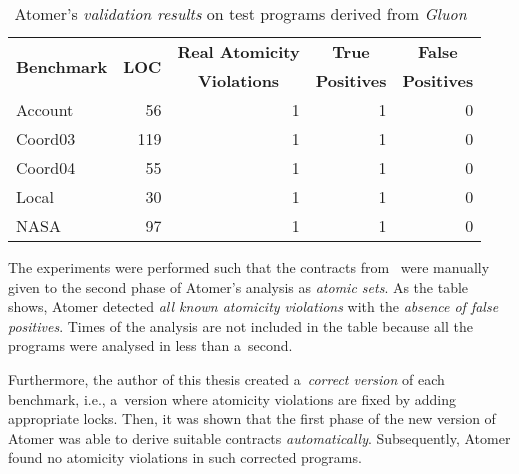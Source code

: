 \begin{table}[hbt]
    \centering

    \begin{tabular}{|l|r|r|r|r|}
        \hline

        \multirow{2}{*}{\textbf{Benchmark}} & \multirow{2}{*}{\textbf{LOC}} & \multicolumn{1}{c|}{\textbf{Real Atomicity}} & \multicolumn{1}{c|}{\textbf{True}} & \multicolumn{1}{c|}{\textbf{False}} \\
        
        & & \multicolumn{1}{c|}{\textbf{Violations}} & \multicolumn{1}{c|}{\textbf{Positives}} & \multicolumn{1}{c|}{\textbf{Positives}} \\ \hline \hline

        Account~\cite{atomicityOOP} & 56 & 1 & 1 & 0 \\ \hline
        
        Coord03~\cite{hlDataRaces} & 119 & 1 & 1 & 0 \\ \hline
        
        Coord04~\cite{blockLocalAtom} & 55 & 1 & 1 & 0 \\ \hline
        
        Local~\cite{hlDataRaces} & 30 & 1 & 1 & 0 \\ \hline
        
        NASA~\cite{hlDataRaces} & 97 & 1 & 1 & 0 \\ \hline
    \end{tabular}

    \caption{Atomer's \emph{validation results} on test programs derived from \emph{Gluon}~\cite{contracts2017, contracts2015}}
    \label{tab:expGluon}
\end{table}

The experiments were performed such that the contracts from~\cite{contracts2017} were manually given to the second phase of Atomer's analysis as \emph{atomic sets}. As the table shows, Atomer detected \emph{all known atomicity violations} with the \emph{absence of false positives}. Times of the analysis are not included in the table because all the programs were analysed in less than a~second.

Furthermore, the author of this thesis created a~\emph{correct version} of each benchmark, i.e., a~version where atomicity violations are fixed by adding appropriate locks. Then, it was shown that the first phase of the new version of Atomer was able to derive suitable contracts \emph{automatically}. Subsequently, Atomer found no atomicity violations in such corrected programs.


